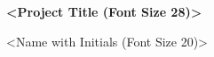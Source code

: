 
\title{}
\date{}
\author{}

\begin{titlepage}
    \begin{center}
    \vspace*{4cm}

    {\fontsize{32pt}{38.4pt}\selectfont
    \textbf{\textless Project Title (Font Size 28)\textgreater{}}
    }
    \vspace{16cm}
    
    {\fontsize{20pt}{24pt}\selectfont
    \textless Name with Initials (Font Size 20)\textgreater{}
    }
    
    \end{center}
    \thispagestyle{empty}
\end{titlepage}




